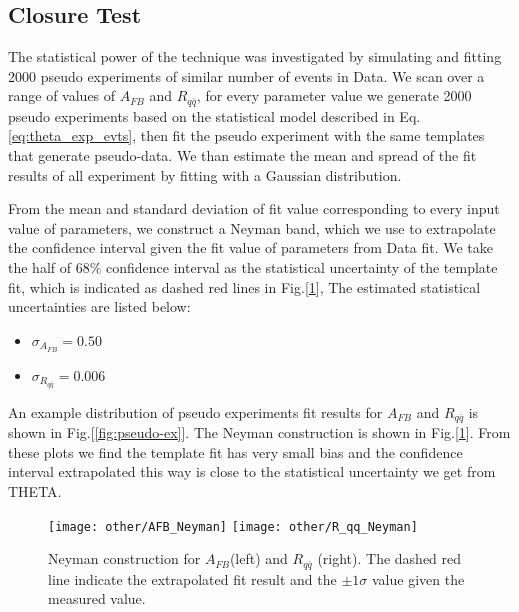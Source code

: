 \subsection{Closure Test}

The statistical power of the technique was investigated by simulating and fitting 2000 pseudo experiments of similar number of events in Data. We scan over a range of values of $A_{FB}$ and $R_{q \bar q}$, for every parameter value we generate 2000 pseudo experiments based on the statistical model described in Eq.\ref{eq:theta_exp_evts}, then fit the pseudo experiment with the same templates that generate pseudo-data. We than estimate the mean and spread of the fit results of all experiment by fitting with a Gaussian distribution. 

From the mean and standard deviation of fit value corresponding to every input value of parameters, we construct a Neyman band, which we use to extrapolate the confidence interval given the fit value of parameters from Data fit. We take the half of $68\%$ confidence interval as the statistical uncertainty of the template fit, which is indicated as dashed red lines in Fig.[\ref{fig:neyman}], The estimated statistical uncertainties are listed below:

\begin{itemize}
	
	\item $\sigma_{A_{FB}} = 0.50$
	\item $\sigma_{R_{q\bar q}} = 0.006$
\end{itemize}

An example distribution of pseudo experiments fit results for $A_{FB}$ and $R_{q\bar{q}}$ is shown in Fig.[\ref{fig:pseudo-ex}]. The Neyman construction is shown in Fig.[\ref{fig:neyman}]. From these plots we find the template fit has very small bias and the confidence interval extrapolated this way is close to the statistical uncertainty we get from THETA. 

\begin{figure}[hbt]
	\begin{center}
		\texttt{[image: other/AFB\_Neyman]}
		\texttt{[image: other/R\_qq\_Neyman]}
		\caption{\small Neyman construction for $A_{FB}$(left) and $R_{q\bar q}$ (right). The dashed red line indicate the extrapolated fit result and the $\pm 1 \sigma$ value given the measured value. }
		\label{fig:neyman}
	\end{center}
\end{figure}

